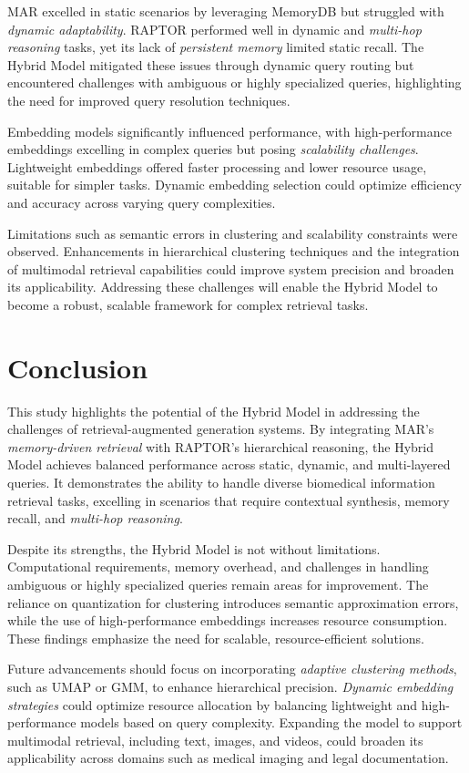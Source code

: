 \documentclass[pdflatex,sn-mathphys-num]{sn-jnl}%
\begin{document}
MAR excelled in static scenarios by leveraging MemoryDB but struggled with \emph{dynamic adaptability}. RAPTOR performed well in dynamic and \emph{multi-hop reasoning} tasks, yet its lack of \emph{persistent memory} limited static recall. The Hybrid Model mitigated these issues through dynamic query routing but encountered challenges with ambiguous or highly specialized queries, highlighting the need for improved query resolution techniques.

Embedding models significantly influenced performance, with high-performance embeddings excelling in complex queries but posing \emph{scalability challenges}. Lightweight embeddings offered faster processing and lower resource usage, suitable for simpler tasks. Dynamic embedding selection could optimize efficiency and accuracy across varying query complexities.

Limitations such as semantic errors in clustering and scalability constraints were observed. Enhancements in hierarchical clustering techniques and the integration of multimodal retrieval capabilities could improve system precision and broaden its applicability. Addressing these challenges will enable the Hybrid Model to become a robust, scalable framework for complex retrieval tasks.




\section{Conclusion}\label{sec7}
This study highlights the potential of the Hybrid Model in addressing the challenges of retrieval-augmented generation systems. By integrating MAR’s \emph{memory-driven retrieval} with RAPTOR’s hierarchical reasoning, the Hybrid Model achieves balanced performance across static, dynamic, and multi-layered queries. It demonstrates the ability to handle diverse biomedical information retrieval tasks, excelling in scenarios that require contextual synthesis, memory recall, and \emph{multi-hop reasoning}.

Despite its strengths, the Hybrid Model is not without limitations. Computational requirements, memory overhead, and challenges in handling ambiguous or highly specialized queries remain areas for improvement. The reliance on quantization for clustering introduces semantic approximation errors, while the use of high-performance embeddings increases resource consumption. These findings emphasize the need for scalable, resource-efficient solutions.

Future advancements should focus on incorporating \emph{adaptive clustering methods}, such as UMAP or GMM, to enhance hierarchical precision. \emph{Dynamic embedding strategies} could optimize resource allocation by balancing lightweight and high-performance models based on query complexity. Expanding the model to support multimodal retrieval, including text, images, and videos, could broaden its applicability across domains such as medical imaging and legal documentation.
\end{document}
